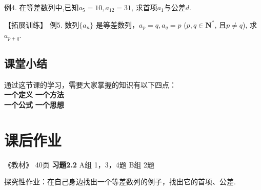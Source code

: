 \documentclass[10pt,a4paper]{article}
\begin{document}
				例4. 在等差数列中,已知$a_5=10, a_{12}=31$, 求首项$a_1$与公差$d$. 
				\vspace{40pt}



				【拓展训练】 例5. 数列$\{a_n\}$ 是等差数列，$a_p=q, a_q=p$ ($p,q \in \mathbf{N}^*$, 且$p\neq q$), 求$a_{p+q}$. 
				\vspace{40pt}





		\subsection{课堂小结}
			通过这节课的学习，需要大家掌握的知识有以下四点：\\
			\textbf{一个定义} \underline{\hspace{60pt}} \hspace{30pt} \textbf{一个方法} \underline{\hspace{60pt}}\\
			\textbf{一个公式} \underline{\hspace{60pt}} \hspace{30pt} \textbf{一个思想} \underline{\hspace{60pt}}


		\section{课后作业}

			《教材》 40页 \hspace{10pt}\textbf{习题2.2 } \hspace{10pt}  A组 1，3，4题  \hspace{10pt}  B组 2题

			探究性作业：在自己身边找出一个等差数列的例子，找出它的首项、公差. 
\end{document}
